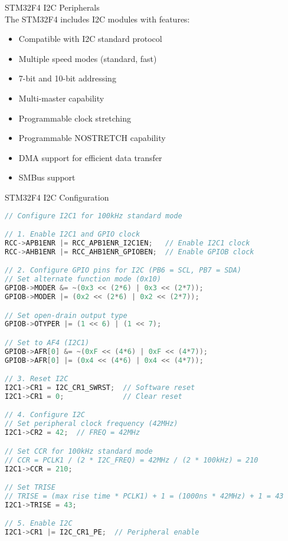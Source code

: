 \begin{concept}{STM32F4 I2C Peripherals}\\
The STM32F4 includes I2C modules with features:
\begin{itemize}
    \item Compatible with I2C standard protocol
    \item Multiple speed modes (standard, fast)
    \item 7-bit and 10-bit addressing
    \item Multi-master capability
    \item Programmable clock stretching
    \item Programmable NOSTRETCH capability
    \item DMA support for efficient data transfer
    \item SMBus support
\end{itemize}
\end{concept}

\begin{code}{STM32F4 I2C Configuration}
\begin{lstlisting}[language=C, style=basesmol]
// Configure I2C1 for 100kHz standard mode

// 1. Enable I2C1 and GPIO clock
RCC->APB1ENR |= RCC_APB1ENR_I2C1EN;   // Enable I2C1 clock
RCC->AHB1ENR |= RCC_AHB1ENR_GPIOBEN;  // Enable GPIOB clock

// 2. Configure GPIO pins for I2C (PB6 = SCL, PB7 = SDA)
// Set alternate function mode (0x10)
GPIOB->MODER &= ~(0x3 << (2*6) | 0x3 << (2*7));
GPIOB->MODER |= (0x2 << (2*6) | 0x2 << (2*7));

// Set open-drain output type
GPIOB->OTYPER |= (1 << 6) | (1 << 7);

// Set to AF4 (I2C1)
GPIOB->AFR[0] &= ~(0xF << (4*6) | 0xF << (4*7));
GPIOB->AFR[0] |= (0x4 << (4*6) | 0x4 << (4*7));

// 3. Reset I2C
I2C1->CR1 = I2C_CR1_SWRST;  // Software reset
I2C1->CR1 = 0;              // Clear reset

// 4. Configure I2C
// Set peripheral clock frequency (42MHz)
I2C1->CR2 = 42;  // FREQ = 42MHz

// Set CCR for 100kHz standard mode
// CCR = PCLK1 / (2 * I2C_FREQ) = 42MHz / (2 * 100kHz) = 210
I2C1->CCR = 210;

// Set TRISE
// TRISE = (max rise time * PCLK1) + 1 = (1000ns * 42MHz) + 1 = 43
I2C1->TRISE = 43;

// 5. Enable I2C
I2C1->CR1 |= I2C_CR1_PE;  // Peripheral enable
\end{lstlisting}
\end{code}

